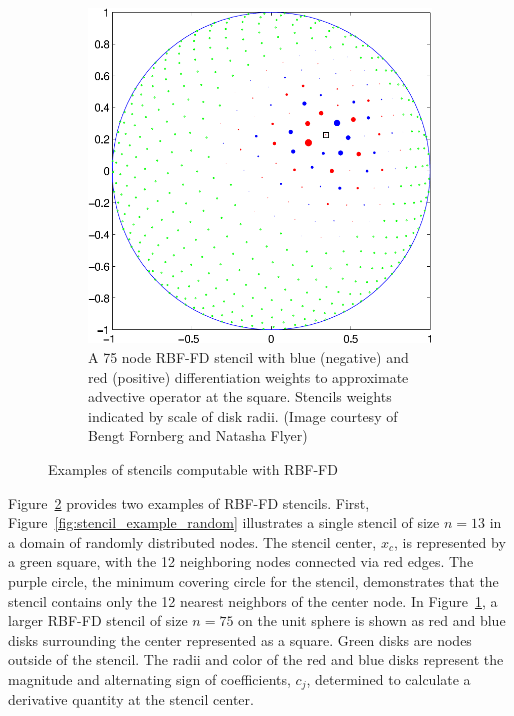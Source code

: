 \documentclass[11pt]{report}
\begin{document}
{\begin{figure}[htbp]
\begin{subfigure}[m]{0.35\textwidth}
		\includegraphics[width=1.0\textwidth]{../figures/chapter2/RBFFD_single-eps-converted-to.pdf}
		\caption{A 75 node RBF-FD stencil with blue (negative) and red (positive) differentiation weights to approximate advective operator at the square. Stencils weights indicated by scale of disk radii. (Image courtesy of Bengt Fornberg and Natasha Flyer)}
		\label{fig:stencil_example_sphere}
	\end{subfigure}
	\caption{Examples of stencils computable with RBF-FD}
	\label{fig:stencil_example}
\end{figure}

Figure~\ref{fig:stencil_example} provides two examples of RBF-FD stencils. First, Figure~\ref{fig:stencil_example_random} illustrates a single stencil of size $n=13$ in a domain of randomly distributed nodes. The stencil center, $x_c$, is represented by a green square, with the 12 neighboring nodes connected via red edges. The purple circle, the minimum covering circle for the stencil, demonstrates that the stencil contains only the 12 nearest neighbors of the center node. In Figure~\ref{fig:stencil_example_sphere}, a larger RBF-FD stencil of size $n=75$ on the unit sphere is shown as red and blue disks surrounding the center represented as a square. Green disks are nodes outside of the stencil. The radii and color of the red and blue disks represent the magnitude and alternating sign of coefficients, $c_j$, determined to calculate a derivative quantity at the stencil center. 

}
\end{document}
